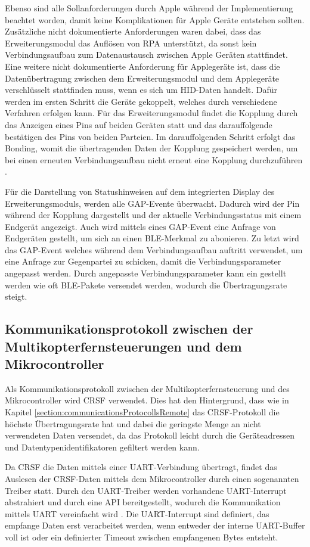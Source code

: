 Ebenso sind alle Sollanforderungen durch Apple während der Implementierung beachtet worden, damit keine Komplikationen für Apple Geräte entstehen sollten. Zusätzliche nicht dokumentierte Anforderungen waren dabei, dass das Erweiterungsmodul das Auflösen von \ac{RPA} unterstützt, da sonst kein Verbindungsaufbau zum Datenaustausch zwischen Apple Geräten stattfindet. Eine weitere nicht dokumentierte Anforderung für Applegeräte ist, dass die Datenübertragung zwischen dem Erweiterungsmodul und dem Applegeräte verschlüsselt stattfinden muss, wenn es sich um \ac{HID}-Daten handelt. Dafür werden im ersten Schritt die Geräte gekoppelt, welches durch verschiedene Verfahren erfolgen kann. Für das Erweiterungsmodul findet die Kopplung durch das Anzeigen eines Pins auf beiden Geräten statt und das darauffolgende bestätigen des Pins von beiden Parteien. Im darauffolgenden Schritt erfolgt das Bonding, womit die übertragenden Daten der Kopplung gespeichert werden, um bei einen erneuten Verbindungsaufbau nicht erneut eine Kopplung durchzuführen \cite{kyneticsBondingPairng}.

Für die Darstellung von Statushinweisen auf dem integrierten Display des Erweiterungsmoduls, werden alle \ac{GAP}-Evente überwacht. Dadurch wird der Pin während der Kopplung dargestellt und der aktuelle Verbindungsstatus mit einem Endgerät angezeigt. Auch wird mittels eines \ac{GAP}-Event eine Anfrage von Endgeräten gestellt, um sich an einen \ac{BLE}-Merkmal zu abonieren. Zu letzt wird das \ac{GAP}-Event welches während dem Verbindungsaufbau auftritt verwendet, um eine Anfrage zur Gegenpartei zu schicken, damit die Verbindungsparameter angepasst werden. Durch angepasste Verbindungsparameter kann ein gestellt werden wie oft \ac{BLE}-Pakete versendet werden, wodurch die Übertragungsrate steigt.

\subsection{Kommunikationsprotokoll zwischen der Multikopterfernsteuerungen und dem Mikrocontroller}
Als Kommunikationsprotokoll zwischen der Multikopterfernsteuerung und des Mikrocontroller wird CRSF verwendet. Dies hat den Hintergrund, dass wie in Kapitel \ref{section:communicationsProtocollsRemote} das CRSF-Protokoll die höchste Übertragungsrate hat und dabei die geringste Menge an nicht verwendeten Daten versendet, da das Protokoll leicht durch die Geräteadressen und Datentypenidentifikatoren gefiltert werden kann.

Da CRSF die Daten mittels einer \ac{UART}-Verbindung übertragt, findet das Auslesen der CRSF-Daten mittels dem Mikrocontroller durch einen sogenannten Treiber statt. Durch den \ac{UART}-Treiber werden vorhandene \ac{UART}-Interrupt abstrahiert und durch eine \ac{API} bereitgestellt, wodurch die Kommunikation mittels \ac{UART} vereinfacht wird \cite{espUARTDriver}. Die \ac{UART}-Interrupt sind definiert, das empfange Daten erst verarbeitet werden, wenn entweder der interne \ac{UART}-Buffer voll ist oder ein definierter Timeout zwischen empfangenen Bytes entsteht.

